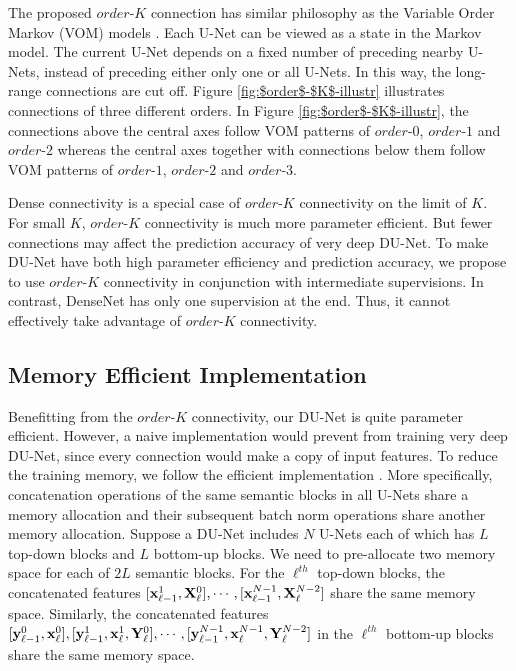 \documentclass[runningheads]{llncs}
\begin{document}
The proposed $order$-$K$ connection has similar philosophy as the Variable Order Markov (VOM) models \cite{begleiter2004prediction}. Each U-Net can be viewed as a state in the Markov model. The current U-Net depends on a fixed number of preceding nearby U-Nets, instead of preceding either only one or all U-Nets. In this way, the long-range connections are cut off. Figure \ref{fig:$order$-$K$-illustr} illustrates connections of three different orders. In Figure \ref{fig:$order$-$K$-illustr}, the connections above the central axes follow VOM patterns of $order$-$0$, $order$-$1$ and $order$-$2$ whereas the central axes together with connections below them follow VOM patterns of $order$-$1$, $order$-$2$ and $order$-$3$.

Dense connectivity is a special case of $order$-$K$ connectivity on the limit of $K$. For small $K$, $order$-$K$ connectivity is much more parameter efficient. But fewer connections may affect the prediction accuracy of very deep DU-Net. To make DU-Net have both high parameter efficiency and prediction accuracy, we propose to use $order$-$K$ connectivity in conjunction with intermediate supervisions. In contrast, DenseNet \cite{huang2016densely} has only one supervision at the end. Thus, it cannot effectively take advantage of $order$-$K$ connectivity.




\subsection{Memory Efficient Implementation}
Benefitting from the $order$-$K$ connectivity, our DU-Net is quite parameter efficient. However, a naive implementation would prevent from training very deep DU-Net, since every connection would make a copy of input features. To reduce the training memory, we follow the efficient implementation \cite{pleiss2017memory}. More specifically, concatenation operations of the same semantic blocks in all U-Nets share a memory allocation and their subsequent batch norm operations share another memory allocation. Suppose a DU-Net includes $N$ U-Nets each of which has $L$ top-down blocks and $L$ bottom-up blocks. We need to pre-allocate two memory space for each of $2L$ semantic blocks. For the $\ell^{th}$ top-down blocks, the concatenated features $[{\bf x}_{\ell-1}^1, {\bf X}_\ell^0], \cdots, [{\bf x}_{\ell-1}^{N-1}, {\bf X}_\ell^{N-2}]$ share the same memory space. Similarly, the concatenated features $[{\bf y}_{\ell-1}^0,{\bf x}_\ell^0], [{\bf y}_{\ell-1}^1,{\bf x}_\ell^1,{\bf Y}_\ell^0], \cdots, [{\bf y}_{\ell-1}^{N-1},{\bf x}_\ell^{N-1},{\bf Y}_\ell^{N-2}]$ in the $\ell^{th}$ bottom-up blocks share the same memory space.
\end{document}

